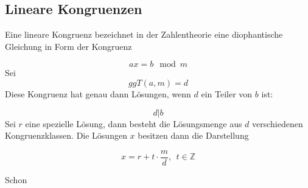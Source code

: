\subsection{Lineare Kongruenzen}
\begin{theorem}
    Eine lineare Kongruenz bezeichnet in der Zahlentheorie eine diophantische Gleichung in Form der Kongruenz

\[ax= b \mod m\]
Sei
\[ggT(a,m)= d\]
Diese Kongruenz hat genau dann Lösungen, wenn $d$ ein Teiler von $b$ ist:

\[d|b\]
Sei $r$ eine spezielle Lösung, dann besteht die Lösungsmenge aus $d$ verschiedenen Kongruenzklassen.
Die L\"osungen $x$ besitzen dann die Darstellung

\[x = r + t \cdot \frac{m}{d}, \ \  t\in \mathbb{Z}\]
\end{theorem}

\begin{theorem}
    Schon
\end{theorem}